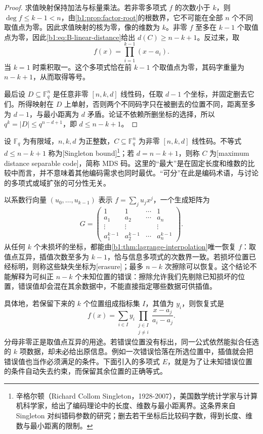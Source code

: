 \begin{proof}
	求值映射保持加法与标量乘法。若非零多项式 \(f\) 的次数小于 \(k\)，则 \(\deg f\leq k-1<n\)，由\cref{b1:prop:factor-root}的根数界，它不可能在全部 \(n\) 个不同取值点为零。因此求值映射的核为零，像的维数为 \(k\)。非零 \(f\) 至多在 \(k-1\) 个取值点为零，因此\eqref{b1:eq:B-linear-distance}给出 \(d(C)\geq n-k+1\)。反过来，取
	\[
		f(x)=\prod_{i=1}^{k-1}(x-a_i).
	\]
	当 \(k=1\) 时乘积取一。这个多项式恰在前 \(k-1\) 个取值点为零，其码字重量为 \(n-k+1\)，从而取得等号。

	最后设 \(D\subseteq\mathbb F_q^n\) 是任意非零 \([n,k,d]\) 线性码，任取 \(d-1\) 个坐标，并固定删去它们。所得映射在 \(D\) 上单射，否则两个不同码字只在被删去的位置不同，距离至多为 \(d-1\)，与最小距离为 \(d\) 矛盾。论证不依赖所删坐标的选择，所以 \(q^k=|D|\leq q^{n-d+1}\)，即 \(d\leq n-k+1\)。
\end{proof}

设 \(\mathbb F_q\) 为有限域，\(n,k,d\) 为正整数，\(C\subseteq\mathbb F_q^n\) 为非零 \([n,k,d]\) 线性码。不等式 \(d\leq n-k+1\) 称为[Singleton bound]\footnote{辛格尔顿（Richard Collom Singleton，1928-2007），美国数学统计学家与计算机科学家，给出了编码理论中的长度、维数与最小距离界。这条界来自 Singleton 对纠错码参数的研究；删去若干坐标后比较码字数，得到长度、维数与最小距离的限制。}；若 \(d=n-k+1\)，则称 \(C\) 为[maximum distance separable code]，简称 MDS 码。这里的“最大”是在固定长度和维数的比较中而言，并不意味着其他编码需求也同时最优。“可分”在此是编码术语，与讨论的多项式或域扩张的可分性无关。

\ProseParagraphBreak
以系数行向量 \((u_0,\ldots,u_{k-1})\) 表示 \(f=\sum_j u_jx^j\)，一个生成矩阵为
\[
	G=\begin{pmatrix}
		1&1&\cdots&1\\
		a_1&a_2&\cdots&a_n\\
		\vdots&\vdots&&\vdots\\
		a_1^{k-1}&a_2^{k-1}&\cdots&a_n^{k-1}
	\end{pmatrix}.
\]
从任何 \(k\) 个未损坏的坐标，都能由\cref{b1:thm:lagrange-interpolation}唯一恢复 \(f\)：取值点互异，插值次数至多为 \(k-1\)，恰与信息多项式的次数界一致。若损坏位置已经标明，则称这些缺失坐标为[erasure]；最多 \(n-k\) 次擦除可以恢复。这个结论不能解释为可纠正 \(n-k\) 个未知位置的错误：擦除允许我们先剔除已知损坏的位置，错误值却会混在其余数据中，不能直接指定哪些数据可供插值。

\ProseParagraphBreak
具体地，若保留下来的 \(k\) 个位置组成指标集 \(I\)，其值为 \(y_i\)，则恢复式是
\[
	f(x)=\sum_{i\in I}y_i\prod_{\substack{j\in I\\j\ne i}} \frac{x-a_j}{a_i-a_j}.
\]
分母非零正是取值点互异的用途。若错误位置没有标出，同一公式依然能拟合任选的 \(k\) 项数据，却未必给出原信息。例如一次错误恰落在所选位置中，插值就会把错误值也当作必须满足的条件。下面引入的多项式 \(E\)，就是为了让未知错误位置的条件自动失去约束，而保留其余位置的正确等式。

